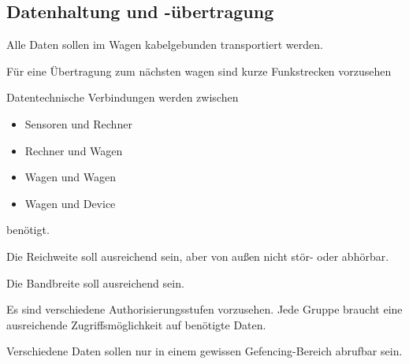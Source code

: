 \subsection{Datenhaltung und -übertragung}
\begin{feat}
Alle Daten sollen im Wagen kabelgebunden transportiert werden. 
\end{feat}
\begin{feat}
Für eine Übertragung zum nächsten wagen sind kurze Funkstrecken vorzusehen
\end{feat}
\begin{rem}
Datentechnische Verbindungen werden zwischen 
\begin{itemize}
    \item Sensoren und Rechner
    \item Rechner und Wagen
    \item Wagen und Wagen
    \item Wagen und Device
\end{itemize}
benötigt.
\end{rem}
\begin{feat}
Die Reichweite soll ausreichend sein, aber von außen nicht stör- oder abhörbar.
\end{feat}
\begin{feat}
Die Bandbreite soll ausreichend sein.
\end{feat}
\begin{feat}
Es sind verschiedene Authorisierungsstufen vorzusehen. Jede Gruppe braucht eine ausreichende Zugriffsmöglichkeit auf benötigte Daten.
\end{feat}
\begin{rem}
Verschiedene Daten sollen nur in einem gewissen Gefencing-Bereich abrufbar sein.
\end{rem}

